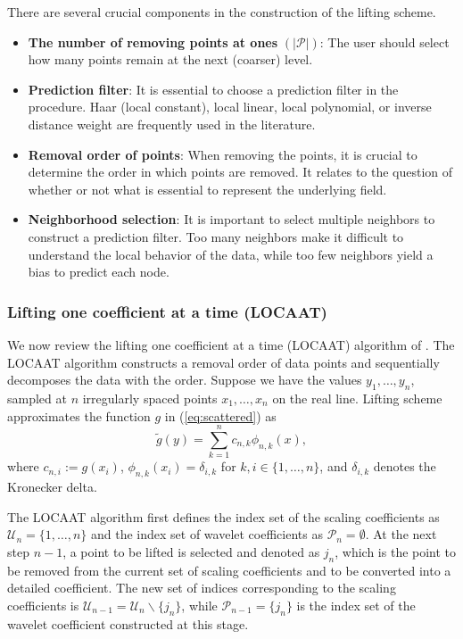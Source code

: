 \documentclass[11pt,titlepage]{article}
\begin{document}
There are several crucial components in the construction of the lifting scheme.
\begin{itemize}
	\item \textbf{The number of removing points at ones} $(|\mathcal{P}|)$: The user should select how many points remain at the next (coarser) level.  
	
	\item \textbf{Prediction filter}: It is essential to choose a prediction filter in the procedure. Haar (local constant), local linear, local polynomial, or inverse distance weight are frequently used in the literature.  
	
	\item \textbf{Removal order of points}: When removing the points, it is crucial to determine the order in which points are removed. It relates to the question of whether or not what is essential to represent the underlying field. 	
	
	\item \textbf{Neighborhood selection}: It is important to select multiple neighbors to construct a prediction filter. Too many neighbors make it difficult to understand the local behavior of the data, while too few neighbors yield a bias to predict each node.
\end{itemize}

\subsubsection{Lifting one coefficient at a time (LOCAAT)}\label{sec:LOCAAT}
We now review the lifting one coefficient at a time (LOCAAT) algorithm of \cite{Jansen2009}. The LOCAAT algorithm constructs a removal order of data points and sequentially decomposes the data with the order. Suppose we have the values $y_{1}, \ldots, y_{n}$, sampled at $n$ irregularly spaced points $x_{1}, \ldots, x_{n}$ on the real line. Lifting scheme approximates the function $g$ in (\ref{eq:scattered}) as 
\[
\tilde{g}(y) = \sum_{k=1}^{n} c_{n,k} \phi_{n,k}(x),
\] 
where $c_{n,i}:=g(x_{i})$, $\phi_{n,k} (x_{i}) = \delta_{i,k}$ for $k,i \in \{1, \ldots, n\}$, and $\delta_{i,k}$ denotes the Kronecker delta. 

The LOCAAT algorithm first defines the index set of the scaling coefficients as $\mathcal{U}_{n} = \{1,\ldots,n\}$ and the index set of wavelet coefficients as $\mathcal{P}_{n} = \emptyset$. At the next step $n-1$, a point to be lifted is selected and denoted as $j_{n}$, which is the point to be removed from the current set of scaling coefficients and to be converted into a detailed coefficient. The new set of indices corresponding to the scaling coefficients is $\mathcal{U}_{n-1} = \mathcal{U}_{n} \backslash \{j_{n}\}$, while $\mathcal{P}_{n-1} = \{ j_{n}\}$ is the index set of the wavelet coefficient constructed at this stage.
\end{document}

